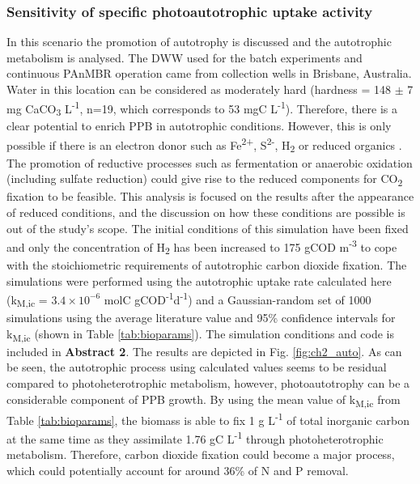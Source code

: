\subsubsection{Sensitivity of specific photoautotrophic uptake activity}
In this scenario the promotion of autotrophy is discussed and the autotrophic metabolism is analysed. The DWW used for the batch experiments and continuous PAnMBR operation came from collection wells in Brisbane, Australia. Water in this location can be considered as moderately hard (hardness = 148 $\pm$ 7 mg CaCO\textsubscript{3} L\textsuperscript{-1}, n=19, which corresponds to 53 mgC L\textsuperscript{-1}). Therefore, there is a clear potential to enrich PPB in autotrophic conditions. However, this is only possible if there is an electron donor such as Fe\textsuperscript{2+}, S\textsuperscript{2-}, H\textsubscript{2} or reduced organics \cite{mckinlay2011}. The promotion of reductive processes such as fermentation or anaerobic oxidation (including sulfate reduction) could give rise to the reduced components for CO\textsubscript{2} fixation to be feasible. This analysis is focused on the results after the appearance of reduced conditions, and the discussion on how these conditions are possible is out of the study's scope. 
\skippingparagraph
The initial conditions of this simulation have been fixed and only the concentration of H\textsubscript{2} has been increased to 175 gCOD m\textsuperscript{-3} to cope with the stoichiometric requirements of autotrophic carbon dioxide fixation. The simulations were performed using the autotrophic uptake rate calculated here (k\textsubscript{M,ic} = $\mathrm{3.4\times10^{-6}}$ molC gCOD\textsuperscript{-1}d\textsuperscript{-1}) and a Gaussian-random set of 1000 simulations using the average literature value and 95\% confidence intervals for k\textsubscript{M,ic} (shown in Table \ref{tab:bioparams}). The simulation conditions and code is included in \textbf{Abstract 2}. The results are depicted in Fig. \ref{fig:ch2_auto}. As can be seen, the autotrophic process using calculated values seems to be residual compared to photoheterotrophic metabolism, however, photoautotrophy can be a considerable component of PPB growth. By using the mean value of k\textsubscript{M,ic} from Table \ref{tab:bioparams}, the biomass is able to fix 1 g L\textsuperscript{-1} of total inorganic carbon at the same time as they assimilate 1.76 gC L\textsuperscript{-1} through photoheterotrophic metabolism. Therefore, carbon dioxide fixation  could become a major process, which could potentially account for around 36\% of N and P removal. 


